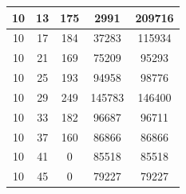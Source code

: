 \documentclass[a4paper,14pt]{extarticle}
\begin{document}
\begin{enumerate}[1.]
\begin{tabular}{|c|c|c|c|c|}
              10                                 & 13                                & 175                                     & 2991          & 209716 \\
              \hline
              10                                 & 17                                & 184                                     & 37283         & 115934 \\
              \hline
              10                                 & 21                                & 169                                     & 75209         & 95293  \\
              \hline
              10                                 & 25                                & 193                                     & 94958         & 98776  \\
              \hline
              10                                 & 29                                & 249                                     & 145783        & 146400 \\
              \hline
              10                                 & 33                                & 182                                     & 96687         & 96711  \\
              \hline
              10                                 & 37                                & 160                                     & 86866         & 86866  \\
              \hline
              10                                 & 41                                & 0                                       & 85518         & 85518  \\
              \hline
              10                                 & 45                                & 0                                       & 79227         & 79227  \\
              \hline
          \end{tabular}


\end{enumerate}
\end{document}
